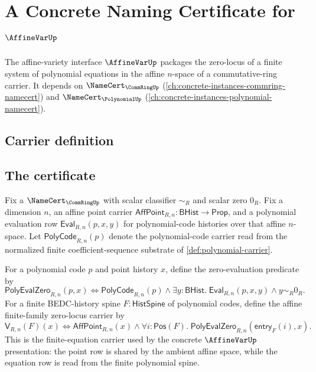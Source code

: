 \chapter{A Concrete Naming Certificate for $\AffineVarUp$}
\label{ch:concrete-instances-affinevar-namecert}

The affine-variety interface $\AffineVarUp$ packages the zero-locus of a finite system of polynomial equations in the affine $n$-space of a commutative-ring carrier. It depends on $\NameCert_{\CommRingUp}$ (\autoref{ch:concrete-instances-commring-namecert}) and $\NameCert_{\PolynomialUp}$ (\autoref{ch:concrete-instances-polynomial-namecert}).

\section{Carrier definition}
\label{sec:affinevar-carrier}

\section{The certificate}
\label{sec:affinevar-certificate}

\begin{definition}
\label{def:affine-finite-family-zero-locus}
Fix a $\NameCert_{\CommRingUp}$ with scalar classifier $\sim_R$ and scalar zero $0_R$. Fix a dimension $n$, an affine point carrier $\mathsf{AffPoint}_{R,n}:\mathsf{BHist}\to\mathsf{Prop}$, and a polynomial evaluation row $\mathsf{Eval}_{R,n}(p,x,y)$ for polynomial-code histories over that affine $n$-space. Let $\mathsf{PolyCode}_{R,n}(p)$ denote the polynomial-code carrier read from the normalized finite coefficient-sequence substrate of \autoref{def:polynomial-carrier}.

For a polynomial code $p$ and point history $x$, define the zero-evaluation predicate by
$$
\mathsf{PolyEvalZero}_{R,n}(p,x)
\Longleftrightarrow
\mathsf{PolyCode}_{R,n}(p)\land
\exists y:\mathsf{BHist}.\;
\mathsf{Eval}_{R,n}(p,x,y)\land y\sim_R 0_R.
$$
For a finite BEDC-history spine $F:\mathsf{HistSpine}$ of polynomial codes, define the affine finite-family zero-locus carrier by
$$
\mathsf{V}_{R,n}(F)(x)
\Longleftrightarrow
\mathsf{AffPoint}_{R,n}(x)\land
\forall i:\mathsf{Pos}(F).\;
\mathsf{PolyEvalZero}_{R,n}(\mathsf{entry}_{F}(i),x).
$$
This is the finite-equation carrier used by the concrete $\AffineVarUp$ presentation: the point row is shared by the ambient affine space, while the equation row is read from the finite polynomial spine.
\end{definition}

